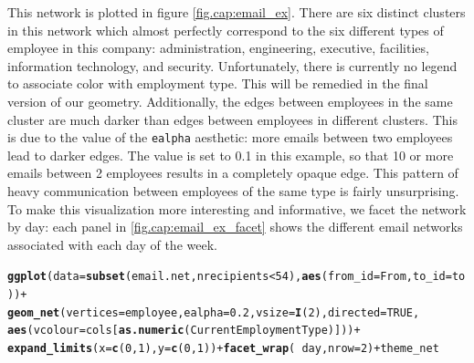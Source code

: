 \documentclass[11pt]{article}\usepackage[]{graphicx}\usepackage[]{color}
\makeatletter
\newcommand{\hlnum}[1]{\textcolor[rgb]{0.686,0.059,0.569}{#1}}%
\newcommand{\hlopt}[1]{\textcolor[rgb]{0,0,0}{#1}}%
\newcommand{\hlstd}[1]{\textcolor[rgb]{0.345,0.345,0.345}{#1}}%
\newcommand{\hlkwc}[1]{\textcolor[rgb]{0.333,0.667,0.333}{#1}}%
\newcommand{\hlkwd}[1]{\textcolor[rgb]{0.737,0.353,0.396}{\textbf{#1}}}%
\newenvironment{kframe}{%
 \def\at@end@of@kframe{}%
 \ifinner\ifhmode%
  \def\at@end@of@kframe{\end{minipage}}%
  \begin{minipage}{\columnwidth}%
 \fi\fi%
 \def\FrameCommand##1{\hskip\@totalleftmargin \hskip-\fboxsep
 \colorbox{shadecolor}{##1}\hskip-\fboxsep
     \hskip-\linewidth \hskip-\@totalleftmargin \hskip\columnwidth}%
 \MakeFramed {\advance\hsize-\width
   \@totalleftmargin\z@ \linewidth\hsize
   \@setminipage}}%
 {\par\unskip\endMakeFramed%
 \at@end@of@kframe}
\newenvironment{knitrout}{}{} %
\makeatother
\begin{document}
This network is plotted in figure \ref{fig.cap:email_ex}.  There are six distinct clusters in this network which almost perfectly correspond to the six different types of employee in this company: administration, engineering, executive, facilities, information technology, and security. Unfortunately, there is currently no legend to associate color with employment type. This will be remedied in the final version of our geometry. Additionally, the edges between employees in the same cluster are much darker than edges between employees in different clusters. This is due to the value of the \texttt{ealpha} aesthetic: more emails between two employees lead to darker edges.  The value is set to 0.1 in this example, so that 10 or more emails between 2 employees results in a completely opaque edge. This pattern of heavy communication between employees of the same type is fairly unsurprising. To make this visualization more interesting and informative, we facet the network by day: each panel in \ref{fig.cap:email_ex_facet} shows the different email networks associated with each day of the week.
\begin{knitrout}
\color{fgcolor}\begin{kframe}
\begin{alltt}
\hlkwd{ggplot}\hlstd{(}\hlkwc{data} \hlstd{=} \hlkwd{subset}\hlstd{(email.net, nrecipients} \hlopt{<} \hlnum{54}\hlstd{),} \hlkwd{aes}\hlstd{(}\hlkwc{from_id} \hlstd{= From,} \hlkwc{to_id} \hlstd{= to))} \hlopt{+}
  \hlkwd{geom_net}\hlstd{(}\hlkwc{vertices} \hlstd{= employee,} \hlkwc{ealpha} \hlstd{=} \hlnum{0.2}\hlstd{,} \hlkwc{vsize} \hlstd{=} \hlkwd{I}\hlstd{(}\hlnum{2}\hlstd{),} \hlkwc{directed} \hlstd{=} \hlnum{TRUE}\hlstd{,}
           \hlkwd{aes}\hlstd{(}\hlkwc{vcolour}\hlstd{=cols[}\hlkwd{as.numeric}\hlstd{(CurrentEmploymentType)]))} \hlopt{+}
  \hlkwd{expand_limits}\hlstd{(}\hlkwc{x}\hlstd{=}\hlkwd{c}\hlstd{(}\hlnum{0}\hlstd{,}\hlnum{1}\hlstd{),} \hlkwc{y} \hlstd{=} \hlkwd{c}\hlstd{(}\hlnum{0}\hlstd{,}\hlnum{1}\hlstd{))} \hlopt{+} \hlkwd{facet_wrap}\hlstd{(}\hlopt{~}\hlstd{day,} \hlkwc{nrow} \hlstd{=} \hlnum{2}\hlstd{)} \hlopt{+} \hlstd{theme_net}
\end{alltt}
\end{kframe}
\end{knitrout}
\end{document}
